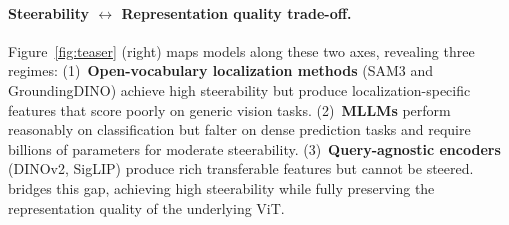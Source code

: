 \paragraph{Steerability $\leftrightarrow$ Representation quality trade-off.}
Figure~\ref{fig:teaser} (right) maps models along these two axes, revealing three regimes:
(1)~\textbf{Open-vocabulary localization methods} (SAM3 and GroundingDINO) achieve high steerability but produce localization-specific features that score poorly on generic vision tasks.
(2)~\textbf{MLLMs} perform reasonably on classification but falter on dense prediction tasks and require billions of parameters for moderate steerability.
(3)~\textbf{Query-agnostic encoders} (DINOv2, SigLIP) produce rich transferable features but cannot be steered.
\model{} bridges this gap, achieving
high steerability 
while fully preserving the representation quality of the underlying ViT.




